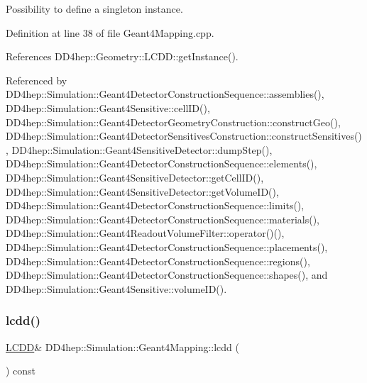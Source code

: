 Possibility to define a singleton instance. 



Definition at line 38 of file Geant4\+Mapping.\+cpp.



References D\+D4hep\+::\+Geometry\+::\+L\+C\+D\+D\+::get\+Instance().



Referenced by D\+D4hep\+::\+Simulation\+::\+Geant4\+Detector\+Construction\+Sequence\+::assemblies(), D\+D4hep\+::\+Simulation\+::\+Geant4\+Sensitive\+::cell\+I\+D(), D\+D4hep\+::\+Simulation\+::\+Geant4\+Detector\+Geometry\+Construction\+::construct\+Geo(), D\+D4hep\+::\+Simulation\+::\+Geant4\+Detector\+Sensitives\+Construction\+::construct\+Sensitives(), D\+D4hep\+::\+Simulation\+::\+Geant4\+Sensitive\+Detector\+::dump\+Step(), D\+D4hep\+::\+Simulation\+::\+Geant4\+Detector\+Construction\+Sequence\+::elements(), D\+D4hep\+::\+Simulation\+::\+Geant4\+Sensitive\+Detector\+::get\+Cell\+I\+D(), D\+D4hep\+::\+Simulation\+::\+Geant4\+Sensitive\+Detector\+::get\+Volume\+I\+D(), D\+D4hep\+::\+Simulation\+::\+Geant4\+Detector\+Construction\+Sequence\+::limits(), D\+D4hep\+::\+Simulation\+::\+Geant4\+Detector\+Construction\+Sequence\+::materials(), D\+D4hep\+::\+Simulation\+::\+Geant4\+Readout\+Volume\+Filter\+::operator()(), D\+D4hep\+::\+Simulation\+::\+Geant4\+Detector\+Construction\+Sequence\+::placements(), D\+D4hep\+::\+Simulation\+::\+Geant4\+Detector\+Construction\+Sequence\+::regions(), D\+D4hep\+::\+Simulation\+::\+Geant4\+Detector\+Construction\+Sequence\+::shapes(), and D\+D4hep\+::\+Simulation\+::\+Geant4\+Sensitive\+::volume\+I\+D().

\hypertarget{class_d_d4hep_1_1_simulation_1_1_geant4_mapping_aa7dde906292e738792cfeb358785d611}{}\label{class_d_d4hep_1_1_simulation_1_1_geant4_mapping_aa7dde906292e738792cfeb358785d611} 
\subsubsection{\texorpdfstring{lcdd()}{lcdd()}}
{\footnotesize\ttfamily \hyperlink{class_d_d4hep_1_1_simulation_1_1_geant4_mapping_a7b098323f9ea570a13d220fe3f09da41}{L\+C\+DD}\& D\+D4hep\+::\+Simulation\+::\+Geant4\+Mapping\+::lcdd (\begin{DoxyParamCaption}{ }\end{DoxyParamCaption}) const\hspace{0.3cm}{\ttfamily [inline]}}



